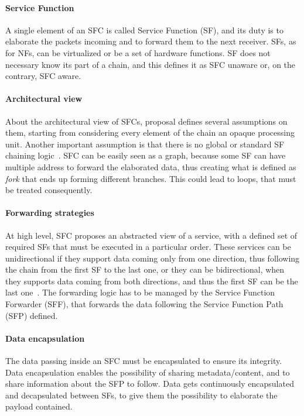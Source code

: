 \paragraph*{Service Function}
A single element of an SFC is called Service Function (SF), and its duty is to
elaborate the packets incoming and to forward them to the next receiver. SFs, as
for NFs, can be virtualized or be a set of hardware functions. SF does not
necessary know its part of a chain, and this defines it as SFC unaware or, on
the contrary, SFC aware.

\paragraph*{Architectural view}
About the architectural view of SFCs, proposal defines several assumptions on
them, starting from considering every element of the chain an opaque processing
unit. Another important assumption is that there is no global or standard SF
chaining logic~\cite{rfc7665}. SFC can be easily seen as a graph, because some
SF can have multiple address to forward the elaborated data, thus creating what
is defined as \emph{fork} that ends up forming different branches. This could
lead to loops, that must be treated consequently.

\paragraph*{Forwarding strategies}
At high level, SFC proposes an abstracted view of a service, with a defined set
of required SFs that must be executed in a particular order. These services can
be unidirectional if they support data coming only from one direction, thus
following the chain from the first SF to the last one, or they can be
bidirectional, when they supports data coming from both directions, and thus the
first SF can be the last one~\cite{rfc7665}. The forwarding logic has to be
managed by the Service Function Forwarder (SFF), that forwards the data
following the Service Function Path (SFP) defined.

\paragraph*{Data encapsulation}
The data passing inside an SFC must be encapsulated to ensure its integrity.
Data encapsulation enables the possibility of sharing metadata/content, and to
share information about the SFP to follow. Data gets continuously encapsulated
and decapsulated between SFs, to give them the possibility to elaborate the
payload contained.

